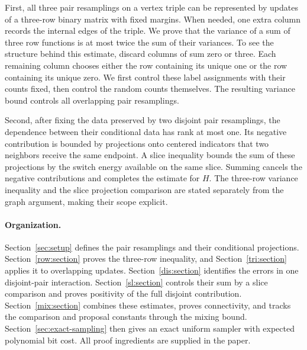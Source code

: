 First, all three pair resamplings on a vertex triple can be represented
by updates of a three-row binary matrix with fixed margins. When needed,
one extra column records the internal edges of the triple. We prove that the
variance of a sum of three row functions is at most twice the sum of
their variances. To see the structure behind this estimate, discard
columns of sum zero or three. Each remaining column chooses either
the row containing its unique one or the row containing its unique zero.
We first control these label assignments with their counts fixed,
then control the random counts themselves. The resulting variance
bound controls all overlapping pair resamplings.

Second, after fixing the data preserved by two disjoint pair
resamplings, the dependence between their conditional data has rank
at most one. Its negative contribution is bounded by projections onto
centered indicators that two neighbors receive the same endpoint.
A slice inequality bounds the sum of these projections by the switch
energy available on the same slice. Summing cancels the negative
contributions and completes the estimate for $H$. The three-row
variance inequality and the slice projection comparison are stated
separately from the graph argument, making their scope explicit.

\paragraph{Organization.}
Section~\ref{sec:setup} defines the pair resamplings and their conditional
projections. Section~\ref{row:section} proves the three-row inequality,
and Section~\ref{tri:section} applies it to overlapping updates.
Section~\ref{dis:section} identifies the errors in one disjoint-pair
interaction. Section~\ref{sl:section} controls their sum by a slice
comparison and proves positivity of the full disjoint contribution.
Section~\ref{mix:section} combines these estimates, proves connectivity,
and tracks the comparison and proposal constants through the mixing
bound. Section~\ref{sec:exact-sampling} then gives an exact uniform
sampler with expected polynomial bit cost. All proof ingredients are
supplied in the paper.


